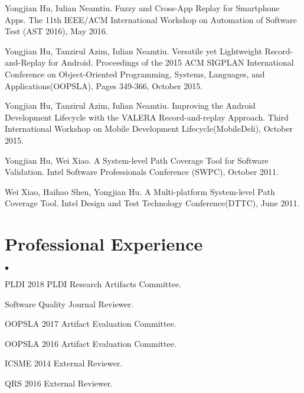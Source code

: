 \documentclass[margin,line]{res}
\newenvironment{list2}{
  \begin{list}{$\bullet$}{%
      \setlength{\itemsep}{0in}
      \setlength{\parsep}{0in} \setlength{\parskip}{0in}
      \setlength{\topsep}{0in} \setlength{\partopsep}{0in} 
      \setlength{\leftmargin}{0.2in}}}{\end{list}}
\begin{document}
\begin{resume}
Yongjian Hu, Iulian Neamtiu. Fuzzy and Cross-App Replay for Smartphone Apps.
The 11th IEEE/ACM International Workshop on Automation of Software Test (AST 2016), May 2016.

Yongjian Hu, Tanzirul Azim, Iulian Neamtiu. Versatile yet Lightweight Record-and-Replay for Android.
Proceedings of the 2015 ACM SIGPLAN International Conference on Object-Oriented Programming, Systems, Languages, and Applications(OOPSLA),
Pages 349-366, October 2015.

Yongjian Hu, Tanzirul Azim, Iulian Neamtiu. Improving the Android Development Lifecycle with the VALERA Record-and-replay Approach.
Third International Workshop on Mobile Development Lifecycle(MobileDeli), October 2015.


Yongjian Hu, Wei Xiao. A System-level Path Coverage Tool for Software Validation.
Intel Software Professionals Conference (SWPC), October 2011.

Wei Xiao, Haihao Shen, Yongjian Hu. A Multi-platform System-level Path Coverage Tool.
Intel Design and Test Technology Conference(DTTC), June 2011.






\section{\sc Professional Experience}
\begin{list2}
\item PLDI 2018 PLDI Research Artifacts Committee.
\item Software Quality Journal Reviewer.
\item OOPSLA 2017 Artifact Evaluation Committee.
\item OOPSLA 2016 Artifact Evaluation Committee.
\item ICSME 2014 External Reviewer.
\item QRS 2016 External Reviewer.
\end{list2}


\end{resume}
\end{document}

